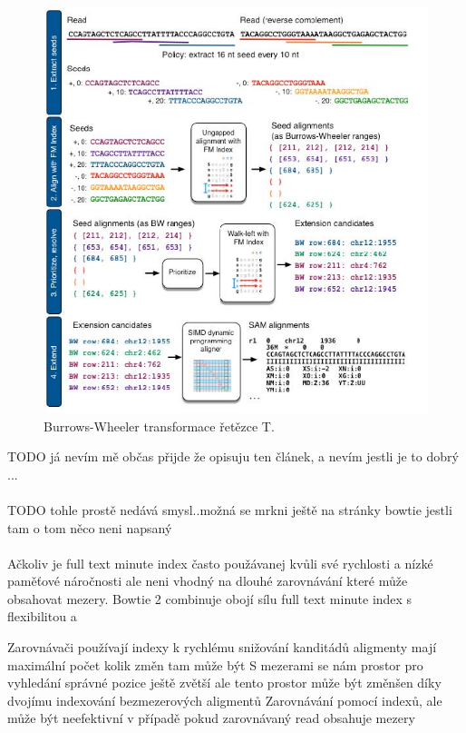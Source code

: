 \documentclass[czech,DP]{thesiskiv}
\numberwithin{equation}{section}
\begin{document}
\begin{figure}[H]		
		\centering
		\includegraphics[width=1\textwidth]{./img/bowtie2_postup.png}
		\caption{Burrows-Wheeler transformace řetězce T. \cite{bw_transform}}
		\label{fig:bw_transform_1}
\end{figure}


TODO já nevím mě občas přijde že opisuju ten článek, a nevím jestli je to dobrý ...
\\
\\
TODO tohle prostě nedává smysl..možná se mrkni ještě na stránky bowtie jestli tam o tom něco neni napsaný
\\
\\
Ačkoliv je full text minute index často použávanej kvůli své rychlosti a nízké paměťové náročnosti ale neni vhodný na dlouhé zarovnávání které může obsahovat mezery. Bowtie 2 combinuje obojí sílu full text minute index s flexibilitou a 

Zarovnávači používají indexy k rychlému snižování kanditádů 
aligmenty mají maximální počet kolik změn tam může být 
S mezerami se nám prostor pro vyhledání správné pozice ještě zvětší
ale tento prostor může být změnšen díky dvojímu indexování bezmezerových aligmentů
Zarovnávání pomocí indexů, ale může být neefektivní v případě pokud zarovnávaný read obsahuje mezery
 
\end{document}
